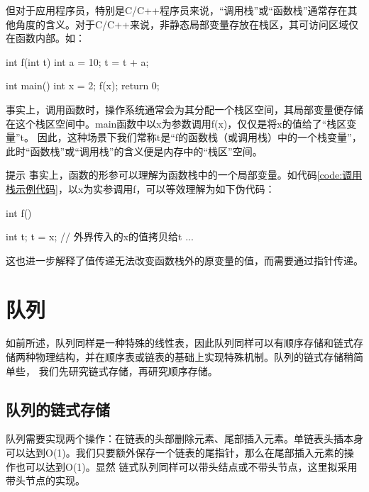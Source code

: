 但对于应用程序员，特别是C/C++程序员来说，“调用栈”或“函数栈”通常存在其他角度的含义。对于C/C++来说，非静态局部变量存放在栈区，其可访问区域仅在函数内部。如：
\begin{cppcodeNum}[label={code:调用栈示例代码}]
    int f(int t) {
        int a = 10;
        t = t + a;
    }

    int main() {
        int x = 2;
        f(x);
        return 0;
    }
\end{cppcodeNum}
事实上，调用函数时，操作系统通常会为其分配一个栈区空间，其局部变量便存储在这个栈区空间中。main函数中以x为参数调用f(x)，仅仅是将x的值给了“栈区变量”t。
因此，这种场景下我们常称t是“f的函数栈（或调用栈）中的一个栈变量”，此时“函数栈”或“调用栈”的含义便是内存中的“栈区”空间。

\begin{notebox}{提示}
    事实上，函数的形参可以理解为函数栈中的一个局部变量。如代码\ref{code:调用栈示例代码}，以x为实参调用f，可以等效理解为如下伪代码：
    \begin{cppcode}
        int f() {
            int t;
            t = x;  // 外界传入的x的值拷贝给t
            ...

        }
    \end{cppcode}
    这也进一步解释了值传递无法改变函数栈外的原变量的值，而需要通过指针传递。
\end{notebox}

\section{队列}
如前所述，队列同样是一种特殊的线性表，因此队列同样可以有顺序存储和链式存储两种物理结构，并在顺序表或链表的基础上实现特殊机制。队列的链式存储稍简单些，
我们先研究链式存储，再研究顺序存储。

\subsection{队列的链式存储}
队列需要实现两个操作：在链表的头部删除元素、尾部插入元素。单链表头插本身可以达到O(1)。我们只要额外保存一个链表的尾指针，那么在尾部插入元素的操作也可以达到O(1)。显然
链式队列同样可以带头结点或不带头节点，这里拟采用带头节点的实现。

